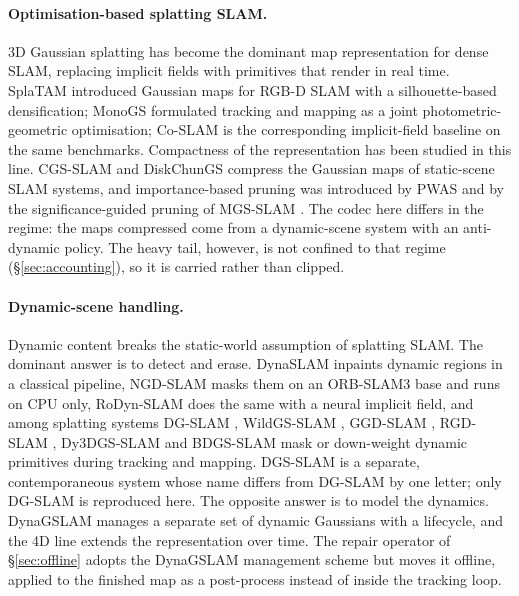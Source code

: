 \documentclass[10pt,twocolumn,letterpaper]{article}
\begin{document}
\paragraph{Optimisation-based splatting SLAM.}
3D Gaussian splatting \cite{Kerbl3DGS} has become the dominant map representation for
dense SLAM, replacing implicit fields with primitives that render in real time.
SplaTAM \cite{SplaTAM} introduced Gaussian maps for RGB-D SLAM with a silhouette-based
densification; MonoGS \cite{MonoGS} formulated tracking and mapping as a joint
photometric-geometric optimisation; Co-SLAM \cite{CoSLAM} is the corresponding
implicit-field baseline on the same benchmarks. Compactness of the representation has been studied
in this line. CGS-SLAM \cite{CGSSlam} and DiskChunGS \cite{DiskChunGS}
compress the Gaussian maps of static-scene SLAM systems, and importance-based pruning
was introduced by PWAS \cite{PWAS} and by the significance-guided pruning of
MGS-SLAM \cite{MGSSlam}. The codec here differs in the regime: the maps compressed come from a
dynamic-scene system with an anti-dynamic policy. The heavy tail, however, is not confined to
that regime (\S\ref{sec:accounting}), so it is carried rather than clipped.

\paragraph{Dynamic-scene handling.}
Dynamic content breaks the static-world assumption of splatting SLAM. The dominant answer is to
detect and erase. DynaSLAM \cite{DynaSLAM} inpaints dynamic regions in a classical pipeline,
NGD-SLAM \cite{NGDSLAM} masks them on an ORB-SLAM3 base and runs on CPU only, RoDyn-SLAM
\cite{RoDynSLAM} does the same with a neural implicit field, and among splatting systems DG-SLAM
\cite{DGSLAM}, WildGS-SLAM \cite{WildGS}, GGD-SLAM \cite{GGD}, RGD-SLAM \cite{RGDSLAM},
Dy3DGS-SLAM \cite{Dy3DGS} and BDGS-SLAM \cite{BDGSS} mask or down-weight dynamic
primitives during tracking and mapping. DGS-SLAM \cite{DGSSlam} is a separate,
contemporaneous system whose name differs from DG-SLAM by one letter; only DG-SLAM is
reproduced here. The opposite answer is to model the dynamics. DynaGSLAM \cite{DynaGSLAM} manages a
separate set of dynamic Gaussians with a
lifecycle, and the 4D line \cite{TC3DGS, MEGA} extends the representation over time.
The repair operator of \S\ref{sec:offline} adopts the DynaGSLAM management scheme but
moves it offline, applied to the finished map as a post-process instead of inside the
tracking loop.
\end{document}

